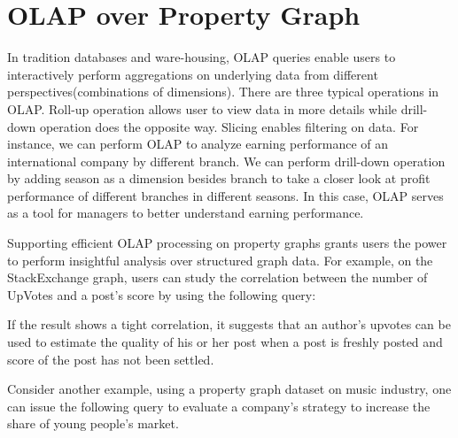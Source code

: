 \section{OLAP over Property Graph}

In tradition databases and ware-housing, OLAP queries enable users to interactively perform aggregations on underlying data from different perspectives(combinations  of dimensions). There are three typical operations in OLAP. Roll-up operation allows user to view data in more details while drill-down operation does the opposite way. Slicing enables filtering on data. For instance, we can perform OLAP to analyze earning performance of an international company by different branch. We can perform drill-down operation by adding season as a dimension besides branch to take a closer look at profit performance of different branches in different seasons. In this case, OLAP serves as a tool for managers to better understand earning performance. 

Supporting efficient OLAP processing on property graphs grants users the power to perform insightful analysis over structured graph data. For example, on the StackExchange graph, users can study the correlation between the number of UpVotes and a post's score by using the following query:


 If the result shows a tight correlation, it suggests that an author’s upvotes can be used to estimate the quality of his or her post when a post is freshly posted and score of the post has not been settled.


Consider another example, using a property graph dataset on music industry,  one can issue the following query to evaluate a company's strategy to increase the share of young people's market.



